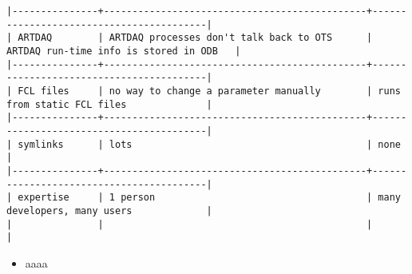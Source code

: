 {\begin{verbatim}
|---------------+----------------------------------------------+-----------------------------------------|
| ARTDAQ        | ARTDAQ processes don't talk back to OTS      | ARTDAQ run-time info is stored in ODB   |
|---------------+----------------------------------------------+-----------------------------------------|
| FCL files     | no way to change a parameter manually        | runs from static FCL files              |
|---------------+----------------------------------------------+-----------------------------------------|
| symlinks      | lots                                         | none                                    |
|---------------+----------------------------------------------+-----------------------------------------|
| expertise     | 1 person                                     | many developers, many users             |
|               |                                              |                                         |
  \end{verbatim}
}



\begin{itemize}
\item
  aaaa
\end{itemize}
